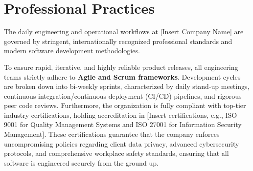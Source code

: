 \section{Professional Practices}
The daily engineering and operational workflows at [Insert Company Name] are governed by stringent, internationally recognized professional standards and modern software development methodologies. 

To ensure rapid, iterative, and highly reliable product releases, all engineering teams strictly adhere to \textbf{Agile and Scrum frameworks}. Development cycles are broken down into bi-weekly sprints, characterized by daily stand-up meetings, continuous integration/continuous deployment (CI/CD) pipelines, and rigorous peer code reviews. Furthermore, the organization is fully compliant with top-tier industry certifications, holding accreditation in [Insert certifications, e.g., ISO 9001 for Quality Management Systems and ISO 27001 for Information Security Management]. These certifications guarantee that the company enforces uncompromising policies regarding client data privacy, advanced cybersecurity protocols, and comprehensive workplace safety standards, ensuring that all software is engineered securely from the ground up.